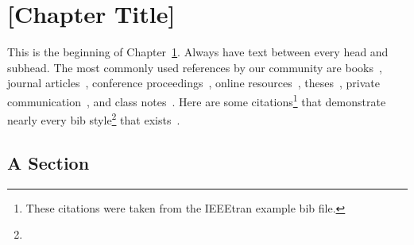 \chapter{[Chapter Title]}\label{ch:common}

This is the beginning of Chapter~\ref{ch:common}. Always have text between every head
and subhead. The most commonly used references by our community are
   books~\cite{IEEEexample:book_typical},
   journal articles~\cite{IEEEexample:article_typical},
   conference proceedings~\cite{IEEEexample:conf_typical},
   online resources~\cite{IEEEhowto:IEEEtranpage},
   theses~\cite{IEEEexample:masters},
   private communication~\cite{IEEEexample:private}, and
   class notes~\cite{NPSexample:notes}.
Here are some citations\footnote{These citations were taken
from the IEEEtran example bib file.} that demonstrate nearly every bib 
style\footnote{\lipsum[10]} that exists~\cite{IEEEhowto:IEEEtranpage,
IEEEexample:shellCTANpage,IEEEexample:bibtexuser,IEEEexample:bibtexdesign,
IEEEexample:tamethebeast,IEEEexample:bibtexguide,
IEEEexample:article_typical,IEEEexample:articleetal,IEEEexample:conf_typical,
IEEEexample:book_typical,IEEEexample:articlelargepages,
IEEEexample:articledualmonths,IEEEexample:TBParticle,
IEEEexample:bookwitheditor,IEEEexample:book,IEEEexample:bookwithseriesvolume,
IEEEexample:inbook,IEEEexample:inbookpagesnote,IEEEexample:incollection,
IEEEexample:incollectionwithseries,IEEEexample:incollection_chpp,
IEEEexample:incollectionmanyauthors,
IEEEexample:motmanualhowpub,IEEEexample:confwithadddays,
IEEEexample:confwithvolume,IEEEexample:confwithpaper,
IEEEexample:confwithpapertype,IEEEexample:presentedatconf,
IEEEexample:masters,IEEEexample:masterstype,IEEEexample:phdurl,
IEEEexample:techrep,IEEEexample:techreptype,IEEEexample:techreptypeii,
IEEEexample:techrepstdsub,IEEEexample:unpublished,IEEEexample:electronhowinfo,
IEEEexample:electronhowinfo2,IEEEexample:electronorgadd,IEEEexample:uspat,
IEEEexample:jppat,IEEEexample:frenchpatreq,
IEEEexample:standard,IEEEexample:standardproposed,IEEEexample:draftasmisc,
IEEEexample:miscforum,IEEEexample:whitepaper,IEEEexample:datasheet,
IEEEexample:private,IEEEexample:miscrfc,IEEEexample:softmanual,
IEEEexample:softonline,IEEEexample:miscgermanreg,IEEEexample:bluebookstandard
}.

\section{A Section}\label{sec:something}
\lipsum[1-4] %

